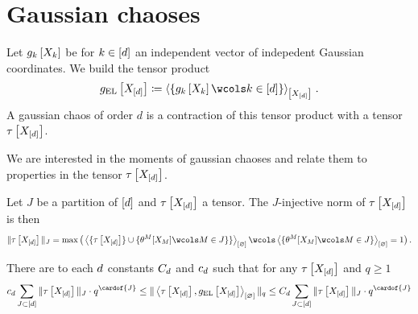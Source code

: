 \section{Gaussian chaoses}

Let $g_{k}\left[X_{k}\right]$ be for $k\in[d]$ an independent vector of indepedent Gaussian coordinates.
We build the tensor product
\begin{align*}
    \gausscoreofat{\elformat}{\shortcatvariables}
    \coloneqq \contractionof{\{\gausscoreofat{\catenumerator}{\catvariableof{\catenumerator}}\wcols\catenumeratorin\}}{\shortcatvariables} \, .
\end{align*}
A gaussian chaos of order $d$ is a contraction of this tensor product with a tensor $\tau\left[X_{[d]}\right]$.

We are interested in the moments of gaussian chaoses and relate them to properties in the tensor $\tau\left[X_{[d]}\right]$.

\begin{definition}
        Let $J$ be a partition of $[d]$ and $\tau\left[X_{[d]}\right]$ a tensor.
        The $J$-injective norm of $\tau\left[X_{[d]}\right]$ is then
        \begin{align*}
            \|\hypercorewith\|_{J}
            = \max \big(\contraction{\{\hypercorewith\}\cup\{\theta^{M}[\catvariableof{M}]\wcols M \in J\}\}}
            \wcols \contraction{\{\theta^{M}[\catvariableof{M}]\wcols M \in J\}}=1
            \big) \, .
        \end{align*}
\end{definition}


\begin{theorem}
        There are to each $d$ constants $C_d$ and $c_d$ such that for any $\tau\left[X_{[d]}\right]$ and $q\geq 1$
        \begin{align*}
            c_{\catorder} \sum_{J\subset[\catorder]} \|\hypercorewith\|_{J} \cdot q^{\cardof{J}}
            \leq
            \|\contraction{\hypercorewith,\gausscoreofat{\elformat}{\shortcatvariables}}\|_q
            \leq
            C_{\catorder} \sum_{J\subset[\catorder]} \|\hypercorewith\|_{J} \cdot q^{\cardof{J}}
        \end{align*}
\end{theorem}